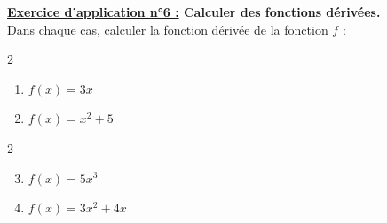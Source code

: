 \documentclass[12pt]{article}
\begin{document}
\begin{mdframed}[
    linewidth=1pt,
    roundcorner=5pt,
    linecolor=RoyalBlue,
    innertopmargin=10pt,
    innerbottommargin=10pt
]
{\color{RoyalBlue}\textbf{\underline{Exercice d'application n°6 :} Calculer des fonctions dérivées.}}
\vspace{5pt}
\\
Dans chaque cas, calculer la fonction dérivée de la fonction $f$ : 
\begin{multicols}{2}
    \begin{enumerate}
        \item $f(x) = 3x$
        \item $f(x) = x^2+5$
    \end{enumerate}
\end{multicols}
\begin{multicols}{2}
    \begin{enumerate}
        \setcounter{enumi}{2}
        \item $f(x) = 5x^3$
        \item $f(x) = 3x^2+4x$
    \end{enumerate}
\end{multicols}
\end{mdframed}
\end{document}
